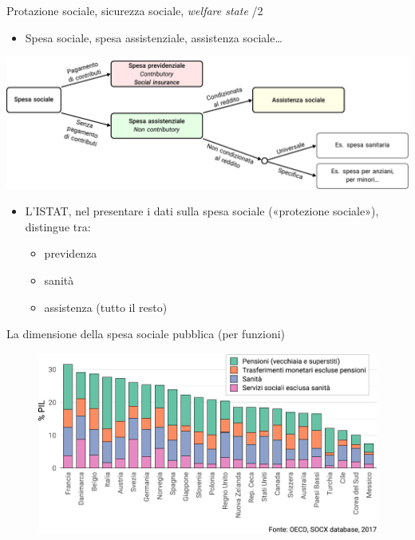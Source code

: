 \documentclass[aspectratio=64,12pt]{beamer}
\begin{document}
\begin{frame}{Protazione sociale, sicurezza sociale, \emph{welfare state} /2}
\begin{itemize}
\item Spesa sociale, spesa assistenziale, assistenza sociale\ldots{}
\end{itemize}

\begin{center}
\includegraphics[width=\linewidth]{./figure/spesa-sociale-classificazione.pdf}
\end{center}

\begin{itemize}
\item L'ISTAT, nel presentare i dati sulla spesa sociale («protezione sociale»), distingue tra:
\begin{itemize}
\item previdenza
\item sanità
\item assistenza (tutto il resto)
\end{itemize}
\end{itemize}
\end{frame}

\begin{frame}{La dimensione della spesa sociale pubblica (per funzioni)}
\begin{figure}[htbp]
\centering
\includegraphics[width=.95\textwidth]{./figure/spesa-sociale-lorda-per-aree-principali-color.pdf}
\end{figure}
\end{frame}
\end{document}
